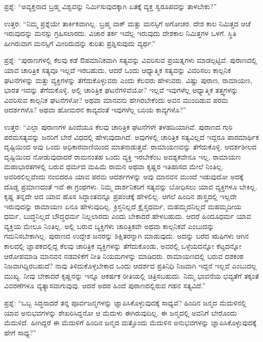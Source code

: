  ಪ್ರಶ್ನೆ: “ಅವ್ಯಕ್ತನಾದ ಬ್ರಹ್ಮ ವಿಶ್ವವನ್ನು ನಿರ್ಮಿಸುವುದಕ್ಕಾಗಿ ಏತಕ್ಕೆ ವ್ಯಕ್ತ ಸ್ವರೂಪವನ್ನು ತಾಳಬೇಕು?” 

 ಉತ್ತರ: “ನಿಮ್ಮ ಪ್ರಶ್ನೆಯೇ ತಾರ್ಕಿಕವಾಗಿಲ್ಲ. ಬ್ರಹ್ಮ ವಾಕ್ ಮತ್ತು ಮನಸ್ಸಿಗೆ ಅಗೋಚರ. ದೇಶ ಕಾಲ ನಿಮಿತ್ತದ ಆಚೆ ಇರುವುದನ್ನು ಮನಸ್ಸು ಗ್ರಹಿಸಲಾರದು. ವಿಚಾರ ತರ್ಕ ಇವೆಲ್ಲ ಇರುವುದು ದೇಶಕಾಲ ನಿಮಿತ್ತಗಳ ಒಳಗೆ. ಸ್ಥಿತಿ ಹೀಗಿರುವಾಗ ಮನಸ್ಸಿಗೆ ಮೀರಿದುದನ್ನು ಕುರಿತು ಪ್ರಶ್ನಿಸುವುದು ವ್ಯರ್ಥ.” 

 ಪ್ರಶ್ನೆ: “ಪುರಾಣಗಳಲ್ಲಿ ಕೆಲವು ಕಡೆ ಔಪಮಾನಿಕವಾಗಿ ಸತ್ಯವನ್ನು ವಿವರಿಸುವ ಪ್ರಯತ್ನಗಳು ಮಾಡಲ್ಪಟ್ಟಿವೆ. ಪುರಾಣದಲ್ಲಿ ಯಾವ ಚಾರಿತ್ರಿಕ ಸತ್ಯವೂ ಇಲ್ಲದೆ ಇರಬಹುದು, ಆದರೆ ಒಂದು ಆಧ್ಯಾತ್ಮಿಕ ಸತ್ಯವನ್ನು ವಿವರಿಸಲು ಕಾಲ್ಪನಿಕ ಘಟನೆಗಳನ್ನು ಮತ್ತು ವ್ಯಕ್ತಿಗಳನ್ನು ತೆಗೆದುಕೊಳ್ಳುವರು ಎಂದು ಕೆಲವರು ಹೇಳುವರು. ವಿಷ್ಣು ಪುರಾಣ, ರಾಮಾಯಣ, ಭಾರತ ಇವನ್ನು ತೆಗೆದುಕೊಳ್ಳಿ. ಅಲ್ಲಿ ಚಾರಿತ್ರಿಕ ಘಟನೆಗಳಿವೆಯೋ? ಇಲ್ಲವೆ ಇವುಗಳೆಲ್ಲ ಆಧ್ಯಾತ್ಮಿಕ ತತ್ತ್ವಗಳನ್ನು ವಿವರಿಸುವ ಕಾಲ್ಪನಿಕ ಘಟನೆಗಳೋ? ಅಥವಾ ಮಾನವನು ಹೇಗಿರಬೇಕೆಂದು ಅವನ ಮುಂದಿಡುವ ಪರಮ ಆದರ್ಶಗಳೊ? ಅಥವಾ ಹೋಮರನ ಕಾವ್ಯದಂತೆ ಇವುಗಳೆಲ್ಲ ಬರಿಯ ಕಾವ್ಯಗಳೊ?” 

 ಉತ್ತರ: “ಎಲ್ಲಾ ಪುರಾಣಗಳ ಹಿಂದೆಯೂ ಕೆಲವು ಚಾರಿತ್ರಿಕ ಘಟನೆಗಳೇ ತಳಹದಿಯಾಗಿವೆ. ಪುರಾಣದ ಗುರಿ ಪರಮಸತ್ಯವನ್ನು ಜನರಿಗೆ ಬೇರೆ ವಿಧದಲ್ಲಿ ಹೇಳುವುದಾಗಿದೆ. ಅವುಗಳಲ್ಲಿ ಚಾರಿತ್ರಿಕ ಸತ್ಯವಿಲ್ಲದೆ ಇದ್ದರೂ ಪಾರಮಾರ್ಥಿಕ ದೃಷ್ಟಿಯಿಂದ ಅವು ಒಂದು ಅಧಿಕಾರವಾಣಿಯಿಂದ ಮಾತನಾಡುತ್ತವೆ. ರಾಮಾಯಣವನ್ನು ತೆಗೆದುಕೊಳ್ಳಿ. ಆದರ್ಶಶೀಲದ ದೃಷ್ಟಿಯಿಂದ ನೋಡುವುದಾದರೆ ರಾಮನಂತಹ ಒಂದು ವ್ಯಕ್ತಿ ಇರಬೇಕೆಂಬ ಅವಶ್ಯಕವೇನೂ ಇಲ್ಲ. ರಾಮಾಯಣ ಮಹಾಭಾರತಗಳಲ್ಲಿ ಬರುವ ಧರ್ಮದ ಮಹಿಮೆ ರಾಮನ ಅಥವಾ ಕೃಷ್ಣರ ಇತಿಹಾಸದ ಮೇಲೆ ನಿಂತಿಲ್ಲ. ಅವರಿರಲಿಲ್ಲವೆಂದು ನಂಬಿದರೂ ಯಾವ ಪರಮ ಆದರ್ಶಗಳನ್ನು ಅವು ಮಾನವನ ಮುಂದೆ ಇಡುವುದೋ ಅದಕ್ಕೆ ದೊಡ್ಡ ಪ್ರಮಾಣದಂತೆ ಇವೆ ಈ ಗ್ರಂಥಗಳು. ನಿಮ್ಮ ದಾರ್ಶನಿಕರಿಗೆ ಸತ್ಯವನ್ನು ಬೋಧಿಸಲು ಯಾವ ವ್ಯಕ್ತಿಗಳೂ ಬೇಕಿಲ್ಲ. ಕೃಷ್ಣ ತನ್ನದೇ ಆದ ಯಾವ ಹೊಸ ಸಿದ್ಧಾಂತವನ್ನೂ ಪ್ರಪಂಚಕ್ಕೆ ಹೇಳಲಿಲ್ಲ. ಆಗಲೆ ಹಿಂದಿನ ಶಾಸ್ತ್ರದಲ್ಲಿ ಇಲ್ಲದೇ ಇರುವುದನ್ನು ರಾಮಾಯಣ ಏನೂ ಹೇಳುವುದಿಲ್ಲ. ಕ್ರಿಸ್ತನಿಲ್ಲದೆ ಕ್ರೈಸ್ತಧರ್ಮ, ಮಹಮ್ಮದನಿಲ್ಲದೆ ಮಹಮ್ಮದೀಯ ಧರ್ಮ, ಬುದ್ಧನಿಲ್ಲದೆ ಬೌದ್ಧಧರ್ಮ ನಿಲ್ಲಲಾರದು ಎಂದು ಬೇಕಾದರೆ ಹೇಳಬಹುದು. ಆದರೆ ಹಿಂದೂಧರ್ಮ ಯಾವ ವ್ಯಕ್ತಿಯ ಮೇಲೂ ನಿಂತಿಲ್ಲ. ಅಲ್ಲಿ ಬರುವ ಬ್ಯಕ್ತಿಗಳು ಚಾರಿತ್ರಿಕವೇ ಅಥವಾ ಕಾಲ್ಪನಿಕವೆ ಎಂಬುದನ್ನು ಗಮನಿಸಬೇಕಾಗಿಲ್ಲ. ಪುರಾಣದ ಉದ್ದೇಶ ಜನರನ್ನು ಶಿಕ್ಷಿತರನ್ನಾಗಿ ಮಾಡುವುದು. ಅದನ್ನು ಬರೆದ ಋಷಿಗಳು ಆಗಿನ ಕಾಲದಲ್ಲಿ ಜ್ಞಾಪಕದಲ್ಲಿದ್ದ ಕೆಲವು ಚಾರಿತ್ರಿಕ ವ್ಯಕ್ತಿಗಳನ್ನು ತೆಗೆದುಕೊಂಡು, ಅವರಲ್ಲಿ ಒಳ್ಳೆಯದನ್ನೋ ಕೆಟ್ಟದನ್ನೋ ಆರೋಪಮಾಡಿ ಮಾನವನ ನಡವಳಿಕೆಗೆ ನೀತಿ ನಿಯಮಗಳನ್ನು ಮಾಡಿದರು. ರಾಮಾಯಣದಲ್ಲಿ ಬರುವ ದಶಕಂಠ ನಿಜವಾಗಿದ್ದಿರಬಹುದೆ? ನಾವು ತಿಳಿದುಕೊಳ್ಳಬೇಕಾದ ಒಂದು ಆದರ್ಶದ ಪ್ರತಿನಿಧಿ ನಿಜವಾಗಿ ಇದ್ದನೆ ಇಲ್ಲವೆ ಎಂಬುದಲ್ಲ ಮುಖ್ಯ. ನೀವು ಬೇಕಾದರೆ ಕೃಷ್ಣನನ್ನು ಇನ್ನೂ ಆಕರ್ಷಕ ರೀತಿಯಲ್ಲಿ ಚಿತ್ರಿಸಬಹುದು. ನಿಮ್ಮ ಭಾವನೆಯ ಭವ್ಯತೆಗೆ ತಕ್ಕಂತೆ ವಿವರಣೆಗಳೂ ವ್ಯತ್ಯಾಸವಾಗುವುವು. ಆದರೆ ಅದರ ಹಿಂದೆ ಪುರಾಣದಲ್ಲಿರುವ ಗಹನ ಸತ್ಯವಿದೆ.” 

 ಪ್ರಶ್ನೆ: “ಒಬ್ಬ ಸಿದ್ಧನಾದರೆ ತನ್ನ ಪೂರ್ವಜನ್ಮಗಳನ್ನು ಜ್ಞಾಪಿಸಿಕೊಳ್ಳುವುದಕ್ಕೆ ಸಾಧ್ಯವೆ? ಹಿಂದಿನ ಜನ್ಮದ ಮೆದುಳಿನಲ್ಲಿ ಯಾವ ಅನುಭವಗಳನ್ನು ಶೇಖರಿಸಿದ್ದನೋ ಆ ಮೆದುಳು ಈಗಿರುವುದಿಲ್ಲ. ಈ ಜನ್ಮದಲ್ಲಿ ಅವನಿಗೆ ಬೇರೊಂದು ಮೆದುಳಿದೆ. ಹೀಗಿದ್ದರೆ ಈ ಮೆದುಳಿಗೆ ಹಿಂದಿನ ಜನ್ಮದ ಮತ್ತೊಂದು ಮೆದುಳಿನ ಅನುಭವಗಳನ್ನು ಜ್ಞಾಪಿಸಿಕೊಳ್ಳುವುದಕ್ಕೆ ಹೇಗೆ ಸಾಧ್ಯ?” 

